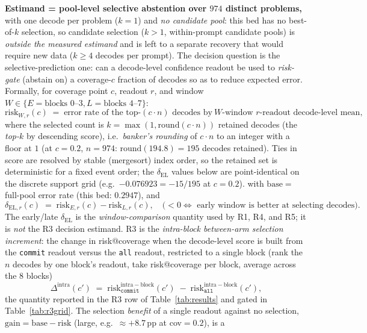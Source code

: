 \documentclass{article}
\begin{document}
\textbf{Estimand = pool-level selective abstention over $974$ distinct problems,}
with one decode per problem ($k{=}1$) and \emph{no candidate pool}: this bed has no
best-of-$k$ selection, so candidate selection ($k{>}1$, within-prompt candidate pools) is
\emph{outside the measured estimand} and is left to a separate recovery that would require
new data ($k{\ge}4$ decodes per prompt). The decision question is the selective-prediction
one: can a decode-level confidence readout be used to \emph{risk-gate} (abstain on) a
coverage-$c$ fraction of decodes so as to reduce expected error. Formally, for coverage
point $c$, readout $r$, and window $W\in\{E{=}\text{blocks 0--3},
L{=}\text{blocks 4--7}\}$:
\[
  \mathrm{risk}_{W,r}(c) \;=\; \text{error rate of the top-}(c\cdot n)\text{ decodes by}
  \ W\text{-window } r\text{-readout decode-level mean},
\]
where the selected count is $k=\max(1,\mathrm{round}(c\cdot n))$ retained decodes (the
\emph{top-}$k$ by descending score), i.e.\ \emph{banker's rounding} of $c\cdot n$ to an integer
with a floor at $1$ (at $c{=}0.2$, $n{=}974$: $\mathrm{round}(194.8){=}195$ decodes retained).
Ties in score are resolved by stable (mergesort) index order, so the retained set is
deterministic for a fixed event order; the $\delta_{\mathrm{EL}}$ values below are
point-identical on the discrete support grid (e.g.\ $-0.076923=-15/195$ at $c{=}0.2$).
with $\mathrm{base}=$ full-pool error rate (this bed: $0.2947$), and
\[
  \delta_{\mathrm{EL},r}(c) \;=\; \mathrm{risk}_{E,r}(c) - \mathrm{risk}_{L,r}(c),\quad
  \text{($<0 \Leftrightarrow$ early window is better at selecting decodes)}.
\]
The early/late $\delta_{\mathrm{EL}}$ is the \emph{window-comparison} quantity used by R1, R4,
and R5; it is \emph{not} the R3 decision estimand. R3 is the \emph{intra-block between-arm
selection increment}: the change in risk@coverage when the decode-level score is built from the
\texttt{commit} readout versus the \texttt{all} readout, restricted to a single block (rank the
$n$ decodes by one block's readout, take risk@coverage per block, average across the $8$ blocks)
\begin{equation}
  \Delta^{\mathrm{intra}}(c')\;=\;\mathrm{risk}^{\mathrm{intra-block}}_{\texttt{commit}}(c')
   \;-\;\mathrm{risk}^{\mathrm{intra-block}}_{\texttt{all}}(c'),
  \label{eq:r3-intra-arm}
\end{equation}
the quantity reported in the R3 row of Table~\ref{tab:results} and gated in
Table~\ref{tab:r3grid}. The selection \emph{benefit} of a single readout against no selection,
$\mathrm{gain}=\mathrm{base}-\mathrm{risk}$ (large, e.g.\ $\approx{+}8.7$\,pp at cov$=0.2$), is a
\end{document}
